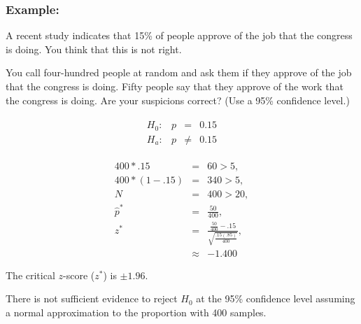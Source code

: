 \begin{frame}
  \frametitle{Example: }

  \vspace*{-2em}
  A recent study indicates that 15\% of people approve of the job that
  the congress is doing. You think that this is not right. 

  You call four-hundred people at random and ask them if they approve
  of the job that the congress is doing. Fifty people say that they
  approve of the work that the congress is doing. Are your suspicions
  correct?  (Use a 95\% confidence level.)

  \vfill

  {
    \begin{eqnarray*}
      \begin{array}{lrcl}
        H_0: & p & = & 0.15 \\
        H_a: & p & \neq & 0.15
      \end{array}
    \end{eqnarray*}
  }

  {
    \begin{eqnarray*}
      400*.15     & = & 60>5, \\
      400*(1-.15) & = & 340>5, \\
      N & = & 400>20, \\
      \hat{p}^* & = & \frac{50}{400}, \\
      z^* & = & \frac{\frac{50}{400}-.15}{\sqrt{\frac{.15(.85)}{400}}}, \\
      & \approx & -1.400
    \end{eqnarray*}
  }
  

  {
    The critical $z$-score ($z^*$) is $\pm 1.96$.
  }

  {

    {\color{red} 

      There is not sufficient evidence to reject $H_0$ at the 95\%
      confidence level assuming a normal approximation to the
      proportion with 400 samples.  

    }

  }

  \vfill
  
\end{frame}





